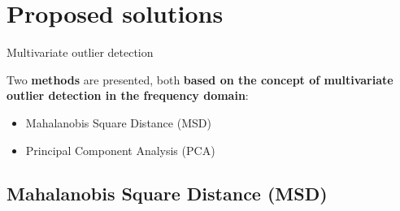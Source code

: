 \section{Proposed solutions}

\begin{frame}{Multivariate outlier detection}

    Two \textbf{methods} are presented, both \textbf{based on the concept of multivariate outlier detection in the frequency domain}:

    \begin{itemize}
        \item Mahalanobis Square Distance (MSD)
        \item Principal Component Analysis (PCA)
    \end{itemize}

\end{frame}



\subsection{Mahalanobis Square Distance (MSD)}

